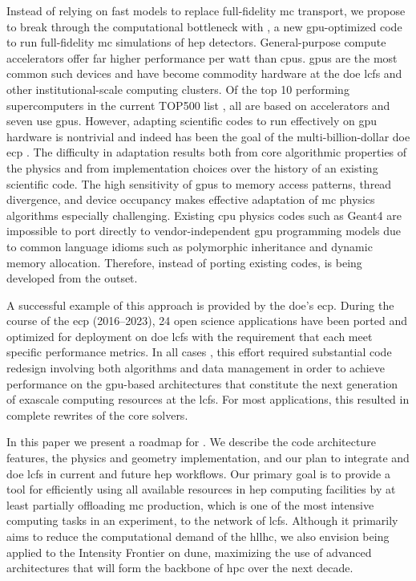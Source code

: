 Instead of relying on fast models to replace full-fidelity \ac{mc} transport, we
propose to break through the computational bottleneck with \celeritas
\cite{github-celeritas}, a new \ac{gpu}-optimized code to run full-fidelity
\ac{mc} simulations of \acs{hep} detectors. General-purpose compute accelerators
offer far higher performance per watt than \acp{cpu}.  \acp{gpu} are the most
common such devices and have become commodity hardware at the \ac{doe} \acp{lcf}
and other institutional-scale computing clusters. Of the top 10 performing
supercomputers in the current TOP500 list \cite{top500}, all are based on
accelerators and seven use \nvidia \acp{gpu}. However, adapting scientific codes
to run effectively on \ac{gpu} hardware is nontrivial and indeed has been the
goal of the multi-billion-dollar \ac{doe} \ac{ecp} \cite{ecp2019}. The
difficulty in adaptation results both from core algorithmic properties of the
physics and from implementation choices over the history of an existing
scientific code. The high sensitivity of \acp{gpu} to memory access patterns,
thread divergence, and device occupancy makes effective adaptation of \ac{mc}
physics algorithms especially challenging. Existing \ac{cpu} physics codes such
as Geant4 are impossible to port directly to vendor-independent \ac{gpu}
programming models due to common \Cpp language idioms such as polymorphic
inheritance and dynamic memory allocation. Therefore, instead of porting
existing codes, \celeritas is being developed from the outset.

A successful example of this approach is provided by the \ac{doe}'s \ac{ecp}.
During the course of the \ac{ecp} (2016--2023), 24 open science applications
have been ported and optimized for deployment on \ac{doe} \acp{lcf} with the
requirement that each meet specific performance metrics.  In all cases
\cite{evans_survey_2021}, this effort required substantial code redesign
involving both algorithms and data management in order to achieve performance on
the \ac{gpu}-based architectures that constitute the next generation of exascale
computing resources at the \acp{lcf}. For most applications, this resulted in
complete rewrites of the core solvers.

In this paper we present a roadmap for \celeritas. We describe the code
architecture features, the physics and geometry implementation, and our plan to
integrate \celeritas and \ac{doe} \acp{lcf} in current and future \ac{hep}
workflows. Our primary goal is to provide a tool for efficiently using all
available resources in \ac{hep} computing facilities by at least partially
offloading \ac{mc} production, which is one of the most intensive computing
tasks in an experiment, to the network of \acp{lcf}. Although it primarily aims
to reduce the computational demand of the \acs{hllhc}, we also envision
\celeritas being applied to the Intensity Frontier on \ac{dune}, maximizing the
use of advanced architectures that will form the backbone of \ac{hpc} over the
next decade.

